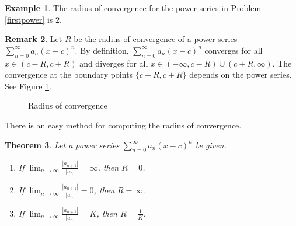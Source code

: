 \documentclass[12pt,letterpaper]{book}
\numberwithin{equation}{section}
\newtheorem{thm}{\textbf{Theorem}}[section]
\theoremstyle{definition}
\newtheorem{example}[thm]{\textbf{Example}}
\newtheorem{remark}[thm]{\textbf{Remark}}
\begin{document}
\begin{example} The radius of convergence for the power series in Problem \ref{firstpower} is $2$.
\end{example}

\begin{remark}
Let $R$ be the radius of convergence of a power series $\displaystyle{\sum_{n=0}^\infty a_n(x-c)^n}$. By definition, $\displaystyle{\sum_{n=0}^\infty a_n(x-c)^n}$ converges for all $x\in(c-R,c+R)$ and diverges for all $x\in (-\infty, c-R)\cup (c+R,\infty)$. The convergence at the boundary points $\{c-R, c+R\}$ depends on the power series. See Figure \ref{rad of conv}.
\end{remark}

\begin{figure}[h]
\begin{center}
\end{center}
\caption{Radius of convergence}
\label{rad of conv}
\end{figure}

There is an easy method for computing the radius of convergence.

\begin{thm} Let a power series $\displaystyle{\sum_{n=0}^\infty a_n(x-c)^n}$ be given.
\begin{enumerate}
\item If $\displaystyle{\lim_{n\to \infty}\frac{|a_{n+1}|}{|a_n|}}=\infty$, then $R=0$.
\item If $\displaystyle{\lim_{n\to \infty}\frac{|a_{n+1}|}{|a_n|}}=0$, then $R=\infty$.
\item If $\displaystyle{\lim_{n\to \infty}\frac{|a_{n+1}|}{|a_n|}}=K$, then $\displaystyle{R=\frac{1}{K}}$.
\end{enumerate}
\end{thm}
\end{document}
